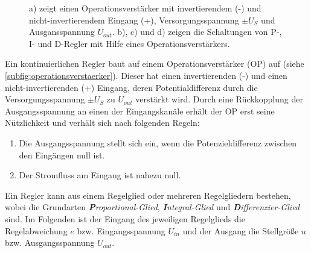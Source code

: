 \begin{figure}[h]
{{{	    	}
	}}
	\caption[Operationsverstärker, Regler]{a) zeigt einen Operationsverstärker
	mit invertierendem (-) und nicht-invertierendem
	Eingang (+), Versorgungsspannung $\pm U_S$ und
	Ausgansspannung $U_{out}$. b), c) und d) zeigen die Schaltungen von
	P-, I- und D-Regler mit Hilfe eines
	Operationsverstärkers.}\label{fig:operationsverstaerker}
\end{figure}
Ein kontinuierlichen Regler baut auf einem Operationsverstärker (OP) auf (siehe
\ref{subfig:operationsverstaerker}). Dieser hat einen invertierenden (-) und
einen nicht-invertierenden (+) Eingang, deren Potentialdifferenz durch die
Versorgungsspannung $\pm U_S$ zu $U_{out}$ verstärkt wird. Durch eine
Rückkopplung der Ausgangsspannung an einen der Eingangskanäle erhält der OP erst
seine Nützlichkeit und verhält sich nach folgenden Regeln:
\begin{enumerate}
       \item Die Ausgangsspannung stellt sich ein, wenn die Potenzieldifferenz
       zwischen den Eingängen null ist.
       \item Der Stromfluss am Eingang ist nahezu null.
\end{enumerate}
Ein Regler kann aus einem Regelglied oder mehreren Regelgliedern bestehen, wobei
die Grundarten \textit{\textbf{P}roportional-Glied}, \textit{\textbf{I}ntegral-Glied} und
\textit{\textbf{D}ifferenzier-Glied} sind. Im Folgenden ist der Eingang des
jeweiligen Regelglieds die Regelabweichung $e$ bzw. Eingangsspannung $U_{in}$
und der Ausgang die Stellgröße $u$ bzw. Ausgangsspannung $U_{out}$.

